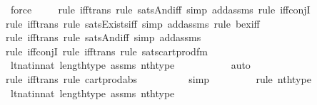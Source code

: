 \begin{isabellebody}
\ force\ \isanewline
\ \ \ \isamarkupfalse%
{\isacharparenleft}{\kern0pt}rule\ iff{\isacharunderscore}{\kern0pt}trans{\isacharcomma}{\kern0pt}\ rule\ sats{\isacharunderscore}{\kern0pt}And{\isacharunderscore}{\kern0pt}iff{\isacharcomma}{\kern0pt}\ simp\ add{\isacharcolon}{\kern0pt}assms{\isacharcomma}{\kern0pt}\ rule\ iff{\isacharunderscore}{\kern0pt}conjI{\isacharparenright}{\kern0pt}\isanewline
\ \ \ \ \isamarkupfalse%
{\isacharparenleft}{\kern0pt}rule\ iff{\isacharunderscore}{\kern0pt}trans{\isacharcomma}{\kern0pt}\ rule\ sats{\isacharunderscore}{\kern0pt}Exists{\isacharunderscore}{\kern0pt}iff{\isacharcomma}{\kern0pt}\ simp\ add{\isacharcolon}{\kern0pt}assms{\isacharcomma}{\kern0pt}\ rule\ bex{\isacharunderscore}{\kern0pt}iff{\isacharparenright}{\kern0pt}\isanewline
\ \ \ \ \isamarkupfalse%
{\isacharparenleft}{\kern0pt}rule\ iff{\isacharunderscore}{\kern0pt}trans{\isacharcomma}{\kern0pt}\ rule\ sats{\isacharunderscore}{\kern0pt}And{\isacharunderscore}{\kern0pt}iff{\isacharcomma}{\kern0pt}\ simp\ add{\isacharcolon}{\kern0pt}assms{\isacharparenright}{\kern0pt}\isanewline
\ \ \ \ \isamarkupfalse%
{\isacharparenleft}{\kern0pt}rule\ iff{\isacharunderscore}{\kern0pt}conjI{}{\isacharcomma}{\kern0pt}\ rule\ iff{\isacharunderscore}{\kern0pt}trans{\isacharcomma}{\kern0pt}\ rule\ sats{\isacharunderscore}{\kern0pt}cartprod{\isacharunderscore}{\kern0pt}fm{\isacharparenright}{\kern0pt}\isanewline
\ \ \isamarkupfalse%
\ lt{\isacharunderscore}{\kern0pt}nat{\isacharunderscore}{\kern0pt}in{\isacharunderscore}{\kern0pt}nat\ length{\isacharunderscore}{\kern0pt}type\ assms\ nth{\isacharunderscore}{\kern0pt}type\isanewline
\ \ \ \ \ \ \ \ \ \isamarkupfalse%
\ auto{\isacharbrackleft}{\kern0pt}{}{\isacharbrackright}{\kern0pt}\isanewline
\ \ \ \ \ \isamarkupfalse%
{\isacharparenleft}{\kern0pt}rule\ iff{\isacharunderscore}{\kern0pt}trans{\isacharcomma}{\kern0pt}\ rule\ cartprod{\isacharunderscore}{\kern0pt}abs{\isacharparenright}{\kern0pt}\isanewline
\ \ \ \ \ \ \ \ \isamarkupfalse%
\ simp\isanewline
\ \ \ \ \ \ \ \ \isamarkupfalse%
{\isacharparenleft}{\kern0pt}rule\ nth{\isacharunderscore}{\kern0pt}type{\isacharparenright}{\kern0pt}\isanewline
\ \ \isamarkupfalse%
\ lt{\isacharunderscore}{\kern0pt}nat{\isacharunderscore}{\kern0pt}in{\isacharunderscore}{\kern0pt}nat\ length{\isacharunderscore}{\kern0pt}type\ assms\ nth{\isacharunderscore}{\kern0pt}type\isanewline
\ \ \ \ \ \ \ \ \ \isamarkupfalse%

\end{isabellebody}
